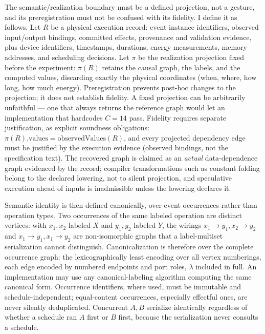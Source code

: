 \documentclass[11pt]{article}
\begin{document}
The semantic/realization boundary must be a defined projection, not a gesture, and its preregistration must not be confused with its fidelity. I define it as follows. Let $R$ be a physical execution record: event-instance identifiers, observed input/output bindings, committed effects, provenance and validation evidence, plus device identifiers, timestamps, durations, energy measurements, memory addresses, and scheduling decisions. Let $\pi$ be the realization projection fixed before the experiment: $\pi(R)$ retains the causal graph, the labels, and the computed values, discarding exactly the physical coordinates (when, where, how long, how much energy). Preregistration prevents post-hoc changes to the projection; it does not establish fidelity. A fixed projection can be arbitrarily unfaithful --- one that always returns the reference graph would let an implementation that hardcodes $C = 14$ pass. Fidelity requires separate justification, as explicit soundness obligations: $\pi(R).\mathrm{values} = \mathrm{observedValues}(R)$, and every projected dependency edge must be justified by the execution evidence (observed bindings, not the specification text). The recovered graph is claimed as an \textit{actual} data-dependence graph evidenced by the record; compiler transformations such as constant folding belong to the declared lowering, not to silent projection, and speculative execution ahead of inputs is inadmissible unless the lowering declares it.

Semantic identity is then defined canonically, over event occurrences rather than operation types. Two occurrences of the same labeled operation are distinct vertices: with $x_1, x_2$ labeled $X$ and $y_1, y_2$ labeled $Y$, the wirings $x_1 \to y_1, x_2 \to y_2$ and $x_1 \to y_1, x_1 \to y_2$ are non-isomorphic graphs that a label-multiset serialization cannot distinguish. Canonicalization is therefore over the complete occurrence graph: the lexicographically least encoding over all vertex numberings, each edge encoded by numbered endpoints and port roles, $\lambda$ included in full. An implementation may use any canonical-labeling algorithm computing the same canonical form. Occurrence identifiers, where used, must be immutable and schedule-independent; equal-content occurrences, especially effectful ones, are never silently deduplicated. Concurrent $A, B$ serialize identically regardless of whether a schedule ran $A$ first or $B$ first, because the serialization never consults a schedule.
\end{document}
